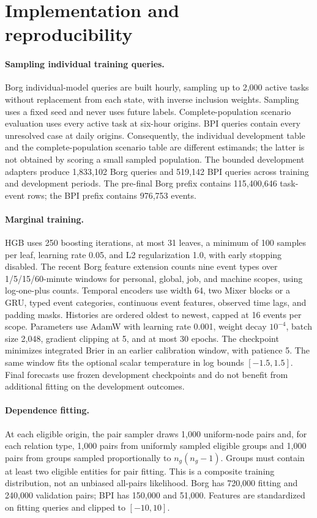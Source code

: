 \section{Implementation and reproducibility}
\paragraph{Sampling individual training queries.}
Borg individual-model queries are built hourly, sampling up to 2,000 active
tasks without replacement from each state, with inverse inclusion weights.
Sampling uses a fixed seed and never uses future labels. Complete-population
scenario evaluation uses every active task at six-hour origins. BPI queries
contain every unresolved case at daily origins. Consequently, the individual
development table and the complete-population scenario table are different
estimands; the latter is not obtained by scoring a small sampled population.
The bounded development adapters produce 1,833,102 Borg queries and 519,142
BPI queries across training and development periods. The pre-final Borg prefix
contains 115,400,646 task-event rows; the BPI prefix contains 976,753 events.

\paragraph{Marginal training.}
HGB uses 250 boosting iterations, at most 31 leaves, a minimum of 100 samples
per leaf, learning rate 0.05, and L2 regularization 1.0, with early stopping
disabled. The recent Borg feature extension counts nine event types over
1/5/15/60-minute windows for personal, global, job, and machine scopes, using
log-one-plus counts. Temporal encoders use width 64, two Mixer blocks or a GRU,
typed event categories, continuous event features, observed time lags, and
padding masks. Histories are ordered oldest to newest, capped at 16 events per
scope. Parameters use AdamW with learning rate 0.001, weight decay $10^{-4}$,
batch size 2,048, gradient clipping at 5, and at most 30 epochs. The checkpoint
minimizes integrated Brier in an earlier calibration window, with patience 5.
The same window fits the optional scalar temperature in log bounds
$[-1.5,1.5]$. Final forecasts use frozen development checkpoints and do not
benefit from additional fitting on the development outcomes.

\paragraph{Dependence fitting.}
At each eligible origin, the pair sampler draws 1,000 uniform-node pairs and,
for each relation type, 1,000 pairs from uniformly sampled eligible groups and
1,000 pairs from groups sampled proportionally to $n_g(n_g-1)$. Groups must
contain at least two eligible entities for pair fitting. This is a composite
training distribution, not an unbiased all-pairs likelihood. Borg has 720,000
fitting and 240,000 validation pairs; BPI has 150,000 and 51,000. Features are
standardized on fitting queries and clipped to $[-10,10]$.

